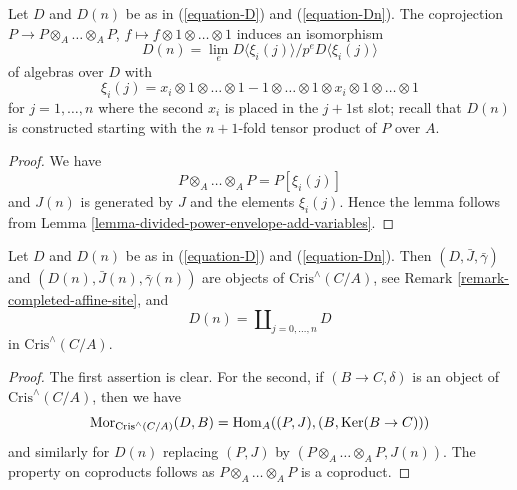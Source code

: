 \begin{lemma}
\label{lemma-structure-Dn}
Let $D$ and $D(n)$ be as in (\ref{equation-D}) and (\ref{equation-Dn}).
The coprojection $P \to P \otimes_A \ldots \otimes_A P$,
$f \mapsto f \otimes 1 \otimes \ldots \otimes 1$
induces an isomorphism
\begin{equation}
\label{equation-structure-Dn}
D(n) = \lim_e D\langle \xi_i(j) \rangle/p^eD\langle \xi_i(j) \rangle
\end{equation}
of algebras over $D$ with
$$
\xi_i(j) = x_i \otimes 1 \otimes \ldots \otimes 1 -
1 \otimes \ldots \otimes 1 \otimes x_i \otimes 1 \otimes \ldots \otimes 1
$$
for $j = 1, \ldots, n$ where the second $x_i$ is placed in the $j + 1$st
slot; recall that $D(n)$ is constructed starting with the
$n + 1$-fold tensor product of $P$ over $A$.
\end{lemma}

\begin{proof}
We have
$$
P \otimes_A \ldots \otimes_A P = P[\xi_i(j)]
$$
and $J(n)$ is generated by $J$ and the elements $\xi_i(j)$.
Hence the lemma follows from
Lemma \ref{lemma-divided-power-envelope-add-variables}.
\end{proof}

\begin{lemma}
\label{lemma-property-Dn}
Let $D$ and $D(n)$ be as in (\ref{equation-D}) and (\ref{equation-Dn}).
Then $(D, \bar J, \bar\gamma)$ and $(D(n), \bar J(n), \bar\gamma(n))$
are objects of $\text{Cris}^\wedge(C/A)$, see
Remark \ref{remark-completed-affine-site}, and
$$
D(n) = \coprod\nolimits_{j = 0, \ldots, n} D
$$
in $\text{Cris}^\wedge(C/A)$.
\end{lemma}

\begin{proof}
The first assertion is clear. For the second, if $(B \to C, \delta)$ is an
object of $\text{Cris}^\wedge(C/A)$, then we have
$$
\mathop{\mathrm{Mor}}\nolimits_{\text{Cris}^\wedge(C/A)}(D, B) = 
\mathop{\mathrm{Hom}}\nolimits_A((P, J), (B, \mathop{\mathrm{Ker}}(B \to C)))
$$
and similarly for $D(n)$ replacing $(P, J)$ by
$(P \otimes_A \ldots \otimes_A P, J(n))$. The property on coproducts follows
as $P \otimes_A \ldots \otimes_A P$ is a coproduct.
\end{proof}

